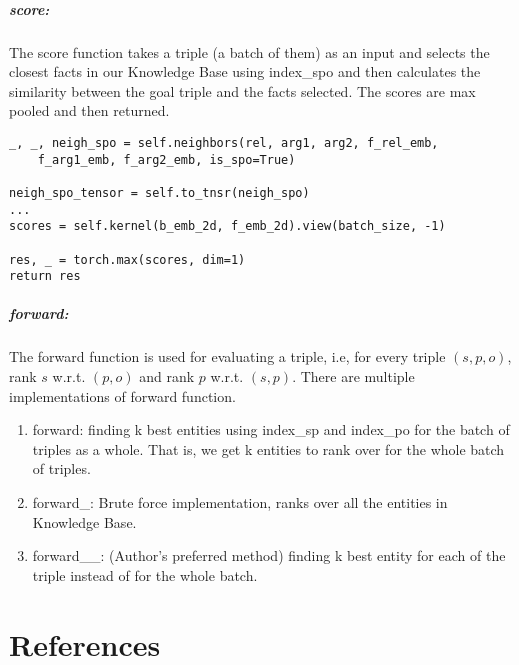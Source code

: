 \documentclass[Other]{iitddiss}
\begin{document}
\paragraph{score:}
The score function takes a triple (a batch of them) as an input and selects the closest facts in our Knowledge Base using index\_spo and then calculates the similarity between the goal triple and the facts selected. The scores are max pooled and then returned.

\begin{lstlisting}
_, _, neigh_spo = self.neighbors(rel, arg1, arg2, f_rel_emb, 
	f_arg1_emb, f_arg2_emb, is_spo=True)

neigh_spo_tensor = self.to_tnsr(neigh_spo)
...
scores = self.kernel(b_emb_2d, f_emb_2d).view(batch_size, -1)

res, _ = torch.max(scores, dim=1)
return res
\end{lstlisting}

\paragraph{forward:}
The forward function is used for evaluating a triple, i.e, for every triple \((s, p, o)\), rank \(s\) w.r.t. \((p, o)\) and rank \(p\) w.r.t. \((s, p)\). There are multiple implementations of forward function.

\begin{enumerate}
\item forward: finding k best entities using index\_sp and index\_po for the batch of triples as a whole. That is, we get k entities to rank over for the whole batch of triples.
\item forward\_: Brute force implementation, ranks over all the entities in Knowledge Base.
\item forward\_\_: (Author's preferred method) finding k best entity for each of the triple instead of for the whole batch.
\end{enumerate}





\begin{singlespace}
  
\end{singlespace}



\chapter{References}
\end{document}
